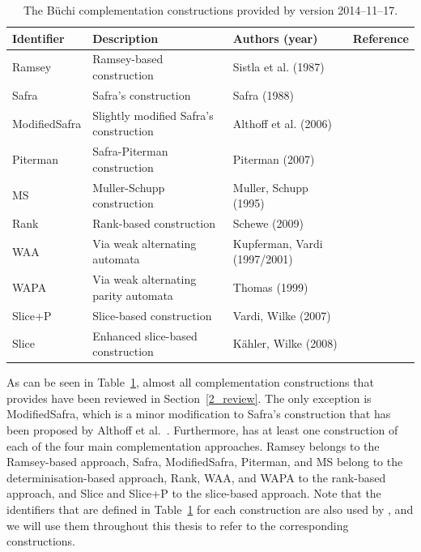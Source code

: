 \begin{table}[htb]
\centering
\begin{tabular}{lllr}
\hline
Identifier & Description & Authors (year) & Reference \\
\hline
Ramsey        & Ramsey-based construction & Sistla et al. (1987)
              & \cite{1985_sistla,PrasadSistla1987217} \\
Safra         & Safra's construction & Safra (1988)
              & \cite{1988_safra_2,1988_safra_1} \\
ModifiedSafra & Slightly modified Safra's construction & Althoff et al. (2006)
              & \cite{2006_althoff} \\
Piterman      & Safra-Piterman construction & Piterman (2007)
              & \cite{2006_piterman,2007_piterman} \\
MS            & Muller-Schupp construction & Muller, Schupp (1995)
              & \cite{Muller199569} \\
Rank          & Rank-based construction & Schewe (2009)
              & \cite{schewe2009buchi} \\
WAA           & Via weak alternating automata & Kupferman, Vardi (1997/2001)
              & \cite{1997_vardi,Kupferman:2001} \\
WAPA          & Via weak alternating parity automata & Thomas (1999)
              & \cite{1999_thomas} \\
Slice+P       & Slice-based construction & Vardi, Wilke (2007)
              & \cite{vardi2007automata} \\
Slice         & Enhanced slice-based construction & Kähler, Wilke (2008)
              & \cite{2008_kaehler} \\
\hline
\end{tabular}
\caption{The Büchi complementation constructions provided by \goal{} version 2014--11--17.}
\label{goal_constructions}
\end{table}

As can be seen in Table~\ref{goal_constructions}, almost all complementation constructions that \goal{} provides have been reviewed in Section~\ref{2_review}. The only exception is ModifiedSafra, which is a minor modification to Safra's construction that has been proposed by Althoff et al.~\cite{2006_althoff}. Furthermore, \goal{} has at least one construction of each of the four main complementation approaches. Ramsey belongs to the Ramsey-based approach, Safra, ModifiedSafra, Piterman, and MS belong to the determinisation-based approach, Rank, WAA, and WAPA to the rank-based approach, and Slice and Slice+P to the slice-based approach. Note that the identifiers that are defined in Table~\ref{goal_constructions} for each construction are also used by \goal, and we will use them throughout this thesis to refer to the corresponding constructions.

